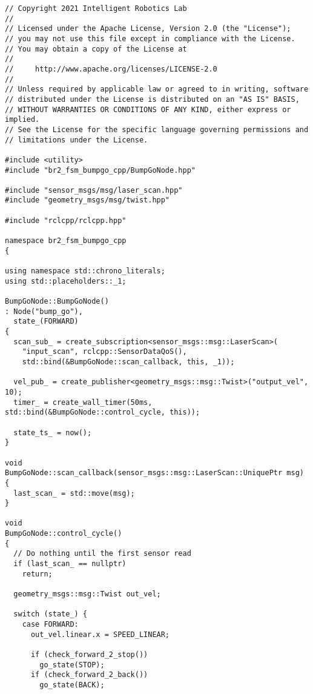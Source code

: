  \footnotesize
\begin{tcolorbox}[sharp corners, colframe=gray!80, colback=LightGray, left=0pt, top=0pt, bottom=0pt, title=\texttt{br2\_fsm\_bumpgo\_cpp/src/br2\_fsm\_bumpgo\_cpp/BumpGoNode.cpp}]
  \begin{verbatim}
// Copyright 2021 Intelligent Robotics Lab
//
// Licensed under the Apache License, Version 2.0 (the "License");
// you may not use this file except in compliance with the License.
// You may obtain a copy of the License at
//
//     http://www.apache.org/licenses/LICENSE-2.0
//
// Unless required by applicable law or agreed to in writing, software
// distributed under the License is distributed on an "AS IS" BASIS,
// WITHOUT WARRANTIES OR CONDITIONS OF ANY KIND, either express or implied.
// See the License for the specific language governing permissions and
// limitations under the License.

#include <utility>
#include "br2_fsm_bumpgo_cpp/BumpGoNode.hpp"

#include "sensor_msgs/msg/laser_scan.hpp"
#include "geometry_msgs/msg/twist.hpp"

#include "rclcpp/rclcpp.hpp"

namespace br2_fsm_bumpgo_cpp
{

using namespace std::chrono_literals;
using std::placeholders::_1;

BumpGoNode::BumpGoNode()
: Node("bump_go"),
  state_(FORWARD)
{
  scan_sub_ = create_subscription<sensor_msgs::msg::LaserScan>(
    "input_scan", rclcpp::SensorDataQoS(),
    std::bind(&BumpGoNode::scan_callback, this, _1));

  vel_pub_ = create_publisher<geometry_msgs::msg::Twist>("output_vel", 10);
  timer_ = create_wall_timer(50ms, std::bind(&BumpGoNode::control_cycle, this));

  state_ts_ = now();
}

void
BumpGoNode::scan_callback(sensor_msgs::msg::LaserScan::UniquePtr msg)
{
  last_scan_ = std::move(msg);
}

void
BumpGoNode::control_cycle()
{
  // Do nothing until the first sensor read
  if (last_scan_ == nullptr)
    return;

  geometry_msgs::msg::Twist out_vel;

  switch (state_) {
    case FORWARD:
      out_vel.linear.x = SPEED_LINEAR;

      if (check_forward_2_stop())
        go_state(STOP);
      if (check_forward_2_back())
        go_state(BACK);


\end{verbatim}
\end{tcolorbox}
